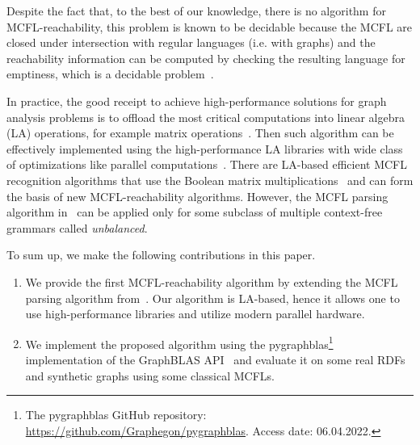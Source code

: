 Despite the fact that, to the best of our knowledge, there is no algorithm for MCFL-reachability, this problem is known to be decidable because the MCFL are closed under intersection with regular languages (i.e. with graphs) and the reachability information can be computed by checking the resulting language for emptiness, which is a decidable problem~\cite{seki1991multiple}.

In practice, the good receipt to achieve high-performance solutions for graph analysis problems is to offload the most critical computations into linear algebra (LA) operations, for example matrix operations~\cite{kepner2016mathematical}. Then such algorithm can be effectively implemented using the high-performance LA libraries with wide class of optimizations like parallel computations~\cite{azimov2021context,azimov2018context}. There are LA-based efficient MCFL recognition algorithms that use the Boolean matrix multiplications~\cite{nakanishi1997efficient,cohen2016parsing} and can form the basis of new MCFL-reachability algorithms. However, the MCFL parsing algorithm in~\cite{cohen2016parsing} can be applied only for some subclass of multiple context-free grammars called \textit{unbalanced}.

To sum up, we make the following contributions in this paper.
\begin{enumerate}
	\item We provide the first MCFL-reachability algorithm by extending the MCFL parsing algorithm from~\cite{nakanishi1997efficient}. Our algorithm is LA-based, hence it allows one to use high-performance libraries and utilize modern parallel hardware.
	\item We implement the proposed algorithm using the pygraphblas\footnote{The pygraphblas GitHub repository: \url{https://github.com/Graphegon/pygraphblas}. Access date: 06.04.2022.} implementation of the GraphBLAS API~\cite{kepner2016mathematical} and evaluate it on some real RDFs and synthetic graphs using some classical MCFLs.
\end{enumerate}
